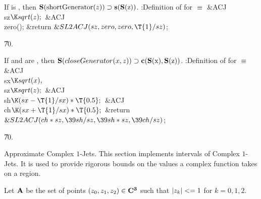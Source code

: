 If  is , then
$\reps{\PB{\\{shortGenerator}(\|z)}}   \supset\shortGen{\reps{z}}$.
\endproposition
\Y\B\4:Definition of  for \X${}%
\E{}$\6
\&{ACJ} \\{sz}${}\K\\{sqrt}(\|z);{}$\6
\&{ACJ} \\{zero}();\7
\&{return} ${}\&{SL2ACJ}(\\{sz},\39\\{zero},\39\\{zero},\39\T{1}/\\{sz}){}$;\par
\U70.\fi

If  and  are , then
$\reps{\PB{$\\{closeGenerator}(\|x,\|z)$}} \supset\closeGen{\reps{x}}{%
\reps{z}}$.
\endproposition
\Y\B\4:Definition of  for \X${}\equiv{}$\6
\&{ACJ} \\{sx}${}\K\\{sqrt}(\|x),{}$ \\{sz}${}\K\\{sqrt}(\|z);{}$\6
\&{ACJ} \\{sh}${}\K(\\{sx}-\T{1}/\\{sx})*\T{0.5};{}$\6
\&{ACJ} \\{ch}${}\K(\\{sx}+\T{1}/\\{sx})*\T{0.5};{}$\7
\&{return} ${}\&{SL2ACJ}(\\{ch}*\\{sz},\39\\{sh}/\\{sz},\39\\{sh}*\\{sz},\39%
\\{ch}/\\{sz}){}$;\par
\U70.\fi

Approximate Complex $1$-Jets.
This section implements intervals of Complex $1$-Jets.
It is used to provide rigorous bounds
on the values a complex function takes on a region.

Let $\bf A$ be the set of points $(z_0, z_1, z_2) \in \bf C^3$
such that $|{z_k}| <= 1$ for $k = 0,1,2$.

